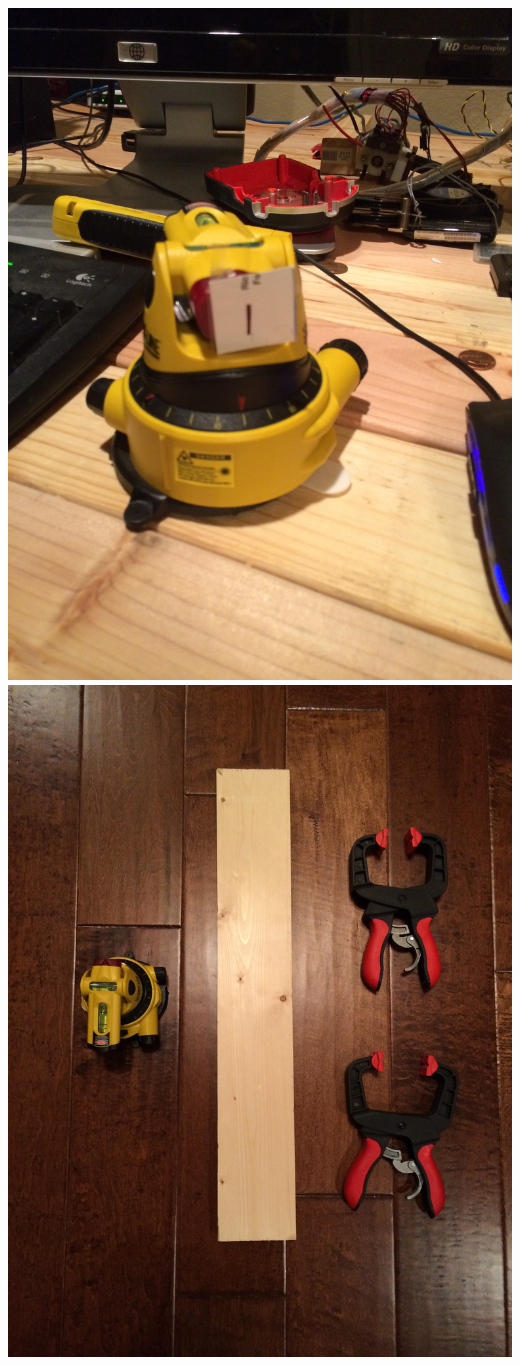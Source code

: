 \documentclass[12pt]{article}
\begin{document}
\includegraphics[scale=0.1,angle=270]{images/volume_analysis_setup/IMG_0617.JPG}
\includegraphics[scale=0.1,angle=270]{images/volume_analysis_setup/IMG_0618.JPG}
\end{document}
